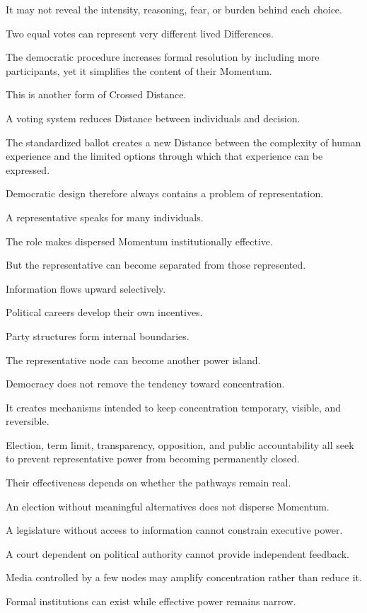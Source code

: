It may not reveal the intensity, reasoning, fear, or burden behind each choice.

Two equal votes can represent very different lived Differences.

The democratic procedure increases formal resolution by including more participants, yet it simplifies the content of their Momentum.

This is another form of Crossed Distance.

A voting system reduces Distance between individuals and decision.

The standardized ballot creates a new Distance between the complexity of human experience and the limited options through which that experience can be expressed.

Democratic design therefore always contains a problem of representation.

A representative speaks for many individuals.

The role makes dispersed Momentum institutionally effective.

But the representative can become separated from those represented.

Information flows upward selectively.

Political careers develop their own incentives.

Party structures form internal boundaries.

The representative node can become another power island.

Democracy does not remove the tendency toward concentration.

It creates mechanisms intended to keep concentration temporary, visible, and reversible.

Election, term limit, transparency, opposition, and public accountability all seek to prevent representative power from becoming permanently closed.

Their effectiveness depends on whether the pathways remain real.

An election without meaningful alternatives does not disperse Momentum.

A legislature without access to information cannot constrain executive power.

A court dependent on political authority cannot provide independent feedback.

Media controlled by a few nodes may amplify concentration rather than reduce it.

Formal institutions can exist while effective power remains narrow.

